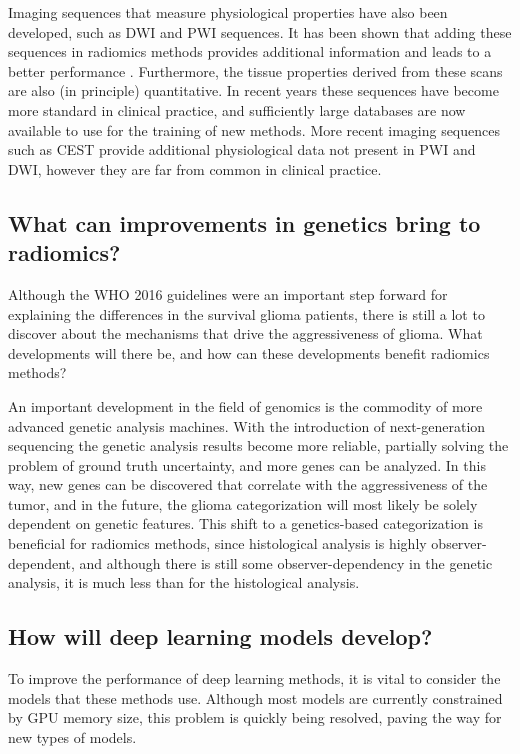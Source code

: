 Imaging sequences that measure physiological properties have also been developed, such as \gls{DWI} and \gls{PWI} sequences.
It has been shown that adding these sequences in radiomics methods provides additional information and leads to a better performance \autocite{park2020radiomicsdwi,kim2020radiomicsdwi}.
Furthermore, the tissue properties derived from these scans are also (in principle) quantitative.
In recent years these sequences have become more standard in clinical practice, and sufficiently large databases are now available to use for the training of new methods.
More recent imaging sequences such as \gls{CEST} provide additional physiological data not present in \gls{PWI} and \gls{DWI}, however they are far from common in clinical practice.



\subsection{What can improvements in genetics bring to radiomics?}\label{sec:discussion_new_genetics}
Although the \gls{WHO} 2016 guidelines were an important step forward for explaining the differences in the survival glioma patients, there is still a lot to discover about the mechanisms that drive the aggressiveness of glioma.
What developments will there be, and how can these developments benefit radiomics methods?

An important development in the field of genomics is the commodity of more advanced genetic analysis machines.
With the introduction of next-generation sequencing the genetic analysis results become more reliable, partially solving the problem of ground truth uncertainty, and more genes can be analyzed.
In this way, new genes can be discovered that correlate with the aggressiveness of the \gls{tumor}, and in the future, the glioma categorization will most likely be solely dependent on genetic features.
This shift to a genetics-based categorization is beneficial for radiomics methods, since histological analysis is highly observer-dependent, and although there is still some observer-dependency in the genetic analysis, it is much less than for the histological analysis.


\subsection{How will deep learning models develop?}

To improve the performance of deep learning methods, it is vital to consider the models that these methods use.
Although most models are currently constrained by GPU memory size, this problem is quickly being resolved, paving the way for new types of models.

